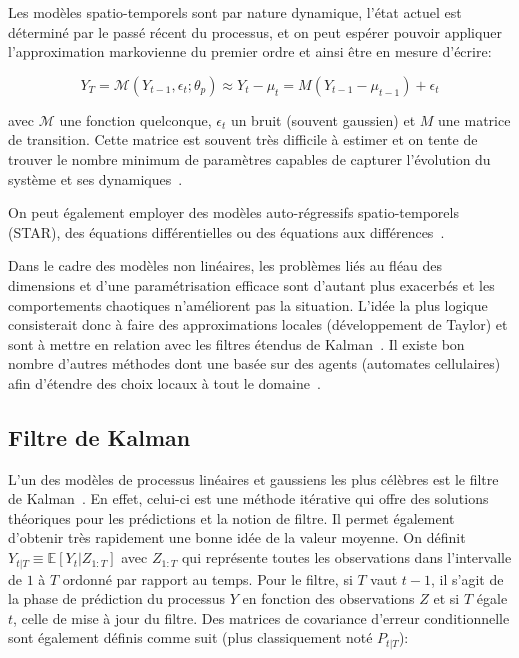 Les modèles spatio-temporels sont par nature dynamique, l'état actuel est déterminé par le passé récent du processus, et on peut espérer pouvoir appliquer l'approximation markovienne du premier ordre et ainsi être en mesure d'écrire:

\begin{equation}
    Y_{T} = \mathcal{M}(Y_{t-1}, \epsilon_{t}; \theta_{p}) \approx Y_{t} - \mu_{t} = M(Y_{t-1} - \mu_{t-1}) + \epsilon_{t}
\end{equation}

avec $\mathcal{M}$ une fonction quelconque, $\epsilon_{t}$ un bruit (souvent gaussien) et $M$ une matrice de transition. Cette matrice est souvent très difficile à estimer et on tente de trouver le nombre minimum de paramètres capables de capturer l'évolution du système et ses dynamiques~\cite{banerjee2014hierarchical}.

On peut également employer des modèles auto-régressifs spatio-temporels (STAR), des équations différentielles ou des équations aux différences~\cite{cameletti2013spatio, gelfand2010handbook}.

Dans le cadre des modèles non linéaires, les problèmes liés au fléau des dimensions et d'une paramétrisation efficace sont d'autant plus exacerbés et les comportements chaotiques n'améliorent pas la situation. L'idée la plus logique consisterait donc à faire des approximations locales (développement de Taylor) et sont à mettre en relation avec les filtres étendus de Kalman~\cite{grewal2011kalman}. Il existe bon nombre d'autres méthodes dont une basée sur des agents (automates cellulaires) afin d'étendre des choix locaux à tout le domaine~\cite{wikle2010general}.

\subsection{Filtre de Kalman}\label{FiltreKalman}

L'un des modèles de processus linéaires et gaussiens les plus célèbres est le filtre de Kalman~\cite{kalman1960new}. En effet, celui-ci est une méthode itérative qui offre des solutions théoriques pour les prédictions et la notion de filtre. Il permet également d'obtenir très rapidement une bonne idée de la valeur moyenne. On définit $Y_{t|T} \equiv \mathbb{E}[Y_{t}|Z_{1:T}]$ avec $Z_{1:T}$ qui représente toutes les observations dans l'intervalle de $1$ à $T$ ordonné par rapport au temps. Pour le filtre, si $T$ vaut $t-1$, il s'agit de la phase de prédiction du processus $Y$ en fonction des observations $Z$ et si $T$ égale $t$, celle de mise à jour du filtre. Des matrices de covariance d'erreur conditionnelle sont également définis comme suit (plus classiquement noté $P_{t|T}$):


